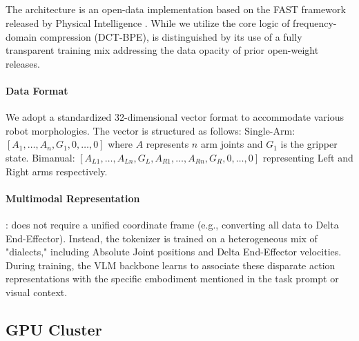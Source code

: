 


\subsection{\molmoactfast}
The \molmoactfast architecture is an open-data implementation based on the FAST framework released by Physical Intelligence \citep{pertsch2025fast}. While we utilize the core logic of frequency-domain compression (DCT-BPE), \molmoactfast is distinguished by its use of a fully transparent training mix addressing the data opacity of prior open-weight releases.

\paragraph{Data Format}
We adopt a standardized 32-dimensional vector format to accommodate various robot morphologies. The vector is structured as follows: Single-Arm: $[A_1, \dots, A_n, G_1, 0, \dots, 0]$ where $A$ represents $n$ arm joints and $G_1$ is the gripper state. Bimanual: $[A_{L1}, \dots, A_{Ln}, G_L, A_{R1}, \dots, A_{Rn}, G_R, 0, \dots, 0]$ representing Left and Right arms respectively.

\paragraph{Multimodal Representation }: \molmoactfast does not require a unified coordinate frame (e.g., converting all data to Delta End-Effector). Instead, the tokenizer is trained on a heterogeneous mix of "dialects," including Absolute Joint positions and Delta End-Effector velocities. During training, the VLM backbone learns to associate these disparate action representations with the specific embodiment mentioned in the task prompt or visual context.


\subsection{GPU Cluster}


